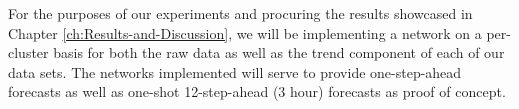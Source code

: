 \noindent \newline For the purposes of our experiments and procuring the results showcased in Chapter \ref{ch:Results-and-Discussion}, we will be implementing a network on a per-cluster basis for both the raw data as well as the trend component of each of our data sets. The networks implemented will serve to provide one-step-ahead forecasts as well as one-shot 12-step-ahead (3 hour) forecasts as proof of concept.

